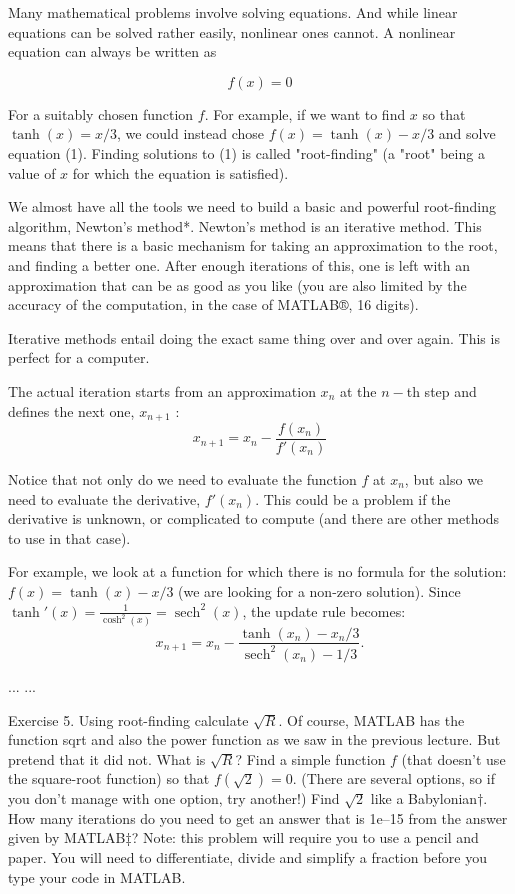 \documentclass[a4paper,12pt]{article}
\DeclareMathOperator{\sech}{sech}
\begin{document}
Many mathematical problems involve solving equations. And while linear equations can be solved rather easily, nonlinear ones cannot. A nonlinear equation can always be written as

\begin{equation} \label{eq:non-linear:function} f(x)=0 \end{equation}


For a suitably chosen function \(f\). For example, if we want to find \(x\) so that \(\tanh(x)=x/3\), we could instead chose \(f(x)=\tanh(x)-x/3\) and solve equation (1). Finding solutions to (1) is called "root-finding" (a "root" being a value of \(x\) for which the equation is satisfied).

We almost have all the tools we need to build a basic and powerful root-finding algorithm, Newton's method*. Newton's method is an iterative method. This means that there is a basic mechanism for taking an approximation to the root, and finding a better one. After enough iterations of this, one is left with an approximation that can be as good as you like (you are also limited by the accuracy of the computation, in the case of MATLAB®, 16 digits).

Iterative methods entail doing the exact same thing over and over again. This is perfect for a computer.

The actual iteration starts from an approximation \(x_n\) at the \(n-\)th step and defines the next one, \(x_{n+1}\) : \begin{equation} \label{eq:2} x_{n+1}=x_n-\frac{f(x_n)}{f'(x_n)} \end{equation}

Notice that not only do we need to evaluate the function \(f\) at \(x_n\), but also we need to evaluate the derivative, \(f'(x_n)\). This could be a problem if the derivative is unknown, or complicated to compute (and there are other methods to use in that case).

For example, we look at a function for which there is no formula for the solution: \(f(x)=\tanh(x) - x/3\) (we are looking for a non-zero solution). Since \(\tanh'(x)=\frac{1}{\cosh^2(x)}=\sech^2(x)\), the update rule becomes: \begin{equation} \label{eq:3} x_{n+1}=x_n-\frac{\tanh(x_n)-x_n/3}{\sech^2(x_n)-1/3}. \end{equation}


... ...

Exercise 5. Using root-finding calculate \(\sqrt{R}\). Of course, MATLAB has the function sqrt and also the power function as we saw in the previous lecture. But pretend that it did not. What is \(\sqrt{R}\)? Find a simple function \(f\) (that doesn't use the square-root function) so that \(f(\sqrt{2})=0\). (There are several options, so if you don't manage with one option, try another!) Find \(\sqrt{2}\) like a Babylonian†. How many iterations do you need to get an answer that is 1e–15 from the answer given by MATLAB‡? Note: this problem will require you to use a pencil and paper. You will need to differentiate, divide and simplify a fraction before you type your code in MATLAB.
\end{document}
